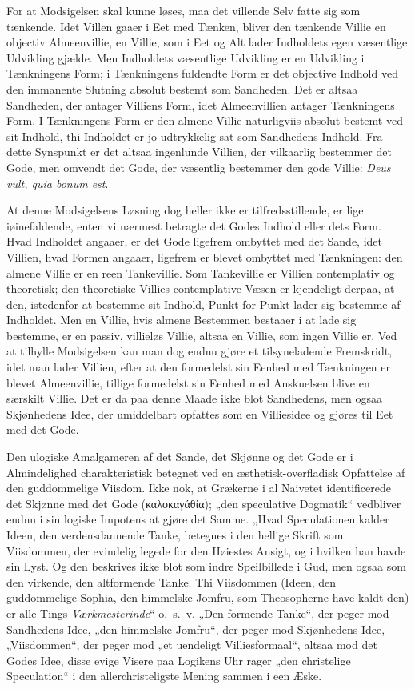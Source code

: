 \documentclass[12pt]{book}
\newcommand{\opage}[1]{\marginnote{\footnotesize\textit{[#1]}}}
\begin{document}
For at Modsigelsen skal kunne løses, maa det villende Selv fatte sig som tænkende. Idet Villen gaaer i Eet med Tænken, bliver den tænkende Villie en objectiv Almeenvillie, en Villie, som i Eet og Alt lader Indholdets egen væsentlige Udvikling gjælde. Men Indholdets væsentlige Udvikling er en Udvikling i Tænkningens Form; i Tænkningens fuldendte Form er det objective Indhold ved den immanente Slutning absolut bestemt som Sandheden. Det er altsaa Sandheden, der antager Villiens Form, idet Almeenvillien antager Tænkningens Form. I Tænkningens Form er den almene Villie naturligviis absolut bestemt ved sit Indhold, thi Indholdet er
\opage{382}jo udtrykkelig sat som Sandhedens Indhold. Fra dette Synspunkt er det altsaa ingenlunde Villien, der vilkaarlig bestemmer det Gode, men omvendt det Gode, der væsentlig bestemmer den gode Villie: \textit{Deus vult, quia bonum est}.

At denne Modsigelsens Løsning dog heller ikke er tilfredsstillende, er lige iøinefaldende, enten vi nærmest betragte det Godes Indhold eller dets Form. Hvad Indholdet angaaer, er det Gode ligefrem ombyttet med det Sande, idet Villien, hvad Formen angaaer, ligefrem er blevet ombyttet med Tænkningen: den almene Villie er en reen Tankevillie. Som Tankevillie er Villien contemplativ og theoretisk; den theoretiske Villies contemplative Væsen er kjendeligt derpaa, at den, istedenfor at bestemme sit Indhold, Punkt for Punkt lader sig bestemme af Indholdet. Men en Villie, hvis almene Bestemmen bestaaer i at lade sig bestemme, er en passiv, villieløs Villie, altsaa en Villie, som ingen Villie er. Ved at tilhylle Modsigelsen kan man dog endnu gjøre et tilsyneladende Fremskridt, idet man lader Villien, efter at den formedelst sin Eenhed med Tænkningen er blevet Almeenvillie, tillige formedelst sin Eenhed med Anskuelsen blive en særskilt Villie. Det er da paa denne Maade ikke blot Sandhedens, men ogsaa Skjønhedens Idee, der umiddelbart opfattes som en Villiesidee og gjøres til Eet med det Gode.

Den ulogiske Amalgameren af det Sande, det Skjønne og det Gode er i Almindelighed charakteristisk betegnet ved en æsthetisk-overfladisk Opfattelse af den guddommelige Viisdom. Ikke nok, at Grækerne i al Naivetet identificerede det Skjønne med det Gode (καλοκαγάθία); %
„den speculative Dogmatik“ vedbliver endnu i sin logiske Impotens at gjøre det Samme. „Hvad Speculationen kalder Ideen, den verdensdannende Tanke, betegnes i den hellige Skrift som Viisdommen, der evindelig legede for den Høiestes Ansigt, og i hvilken han havde sin Lyst. Og den beskrives ikke blot som indre Speilbillede i Gud, men ogsaa som den virkende, den altformende
\opage{383}Tanke. Thi Viisdommen (Ideen, den guddommelige Sophia, den himmelske Jomfru, som Theosopherne have kaldt den) er alle Tings \emph{Værkmesterinde}“ o.\ s.\ v. „Den formende Tanke“, der peger mod Sandhedens Idee, „den himmelske Jomfru“, der peger mod Skjønhedens Idee, „Viisdommen“, der peger mod „et uendeligt Villiesformaal“, altsaa mod det Godes Idee, disse evige Visere paa Logikens Uhr rager „den christelige Speculation“ i den allerchristeligste Mening sammen i een Æske.
\end{document}
